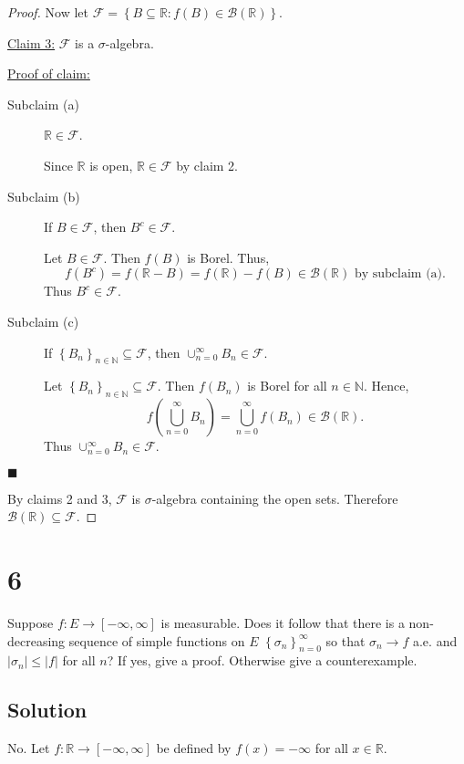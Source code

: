 \documentclass[12pt]{article}
\newenvironment{claimproof}[1]{\par\noindent\underline{Proof of claim:}\space#1}{\hfill $\blacksquare$\vspace{5mm}}
\begin{document}
\begin{proof}
Now let $\mathcal{F} = \left\{ B \subseteq \mathbb{R} : f(B) \in \mathcal{B}(\mathbb{R}) \right\}$.

\underline{Claim 3:} $\mathcal{F}$ is a $\sigma$-algebra.
\begin{claimproof}
\begin{description}
\item[Subclaim (a)] $\mathbb{R} \in \mathcal{F}$.

Since $\mathbb{R}$ is open, $\mathbb{R} \in \mathcal{F}$ by claim 2. 

\item[Subclaim (b)] If $B \in \mathcal{F}$, then $B^{c} \in \mathcal{F}$.

Let $B \in \mathcal{F}$. Then $f(B)$ is Borel. Thus, 
\[ f(B^{c}) = f(\mathbb{R} - B) = f(\mathbb{R}) - f(B) \in \mathcal{B}(\mathbb{R}) \text{ by subclaim (a)}. \]
Thus $B^{c} \in \mathcal{F}$.

\item[Subclaim (c)] If $\left\{ B_{n} \right\}_{n\in\mathbb{N}} \subseteq \mathcal{F}$, then $\cup_{n=0}^{\infty}B_{n} \in \mathcal{F}$.

Let $\left\{ B_{n} \right\}_{n\in\mathbb{N}} \subseteq \mathcal{F}$. Then $f(B_{n})$ is Borel for all $n \in \mathbb{N}$. Hence,
\[ f\left( \bigcup_{n=0}^{\infty} B_{n}\right) = \bigcup_{n=0}^{\infty} f(B_{n}) \in \mathcal{B}(\mathbb{R}). \]
Thus $\cup_{n=0}^{\infty}B_{n} \in \mathcal{F}$.
\end{description}
\end{claimproof}

By claims 2 and 3, $\mathcal{F}$ is $\sigma$-algebra containing the open sets. Therefore $\mathcal{B}(\mathbb{R}) \subseteq \mathcal{F}$.
\end{proof}


\newpage 
\section*{6}
Suppose $f : E \rightarrow [-\infty, \infty]$ is measurable. Does it follow that there is a non-decreasing sequence of simple functions on $E$
$\left\{ \sigma_{n} \right\}_{n=0}^{\infty}$ so that $\sigma_{n}\rightarrow f$ a.e. and $|\sigma_{n}| \leq |f|$ for all $n$? If yes, give a proof.
Otherwise give a counterexample.

\subsection*{Solution}
No. Let $f : \mathbb{R} \rightarrow [-\infty, \infty]$ be defined by $f(x) = -\infty$ for all $x \in \mathbb{R}$.
\end{document}
